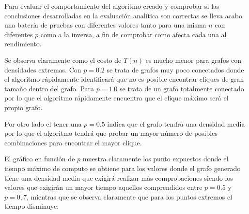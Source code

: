 Para evaluar el comportamiento del algoritmo creado y comprobar si las conclusiones desarrolladas en la evaluación analítica son correctas se lleva acabo una batería de pruebas con diferentes valores tanto para una misma $n$ con diferentes $p$ como a la inversa, a fin de comprobar como afecta cada una al rendimiento.


Se observa claramente como el costo de $T(n)$ es mucho menor para grafos con densidades extremas. Con $p=0.2$ se trata de grafos muy poco conectados donde el algoritmo rápidamente identificará que no es posible encontrar cliques de gran tamaño  dentro del grafo. Para $p=1.0$ se trata de un grafo totalmente conectado por lo que el algoritmo rápidamente encuentra que el clique máximo será el propio grafo.

Por otro lado el tener una $p=0.5$ indica que el grafo tendrá una densidad media por lo que el algoritmo tendrá que probar un mayor número de posibles combinaciones para encontrar el mayor clique.

El gráfico en función de $p$ muestra claramente los punto expuestos donde el tiempo máximo de computo se obtiene para los valores donde el grafo generado tiene una densidad media que exigirá realizar más comprobaciones siendo los valores que exigirán un mayor tiempo aquellos comprendidos entre $p=0.5$ y $p=0,7$, mientras que se observa claramente que para los puntos extremos el tiempo disminuye.

